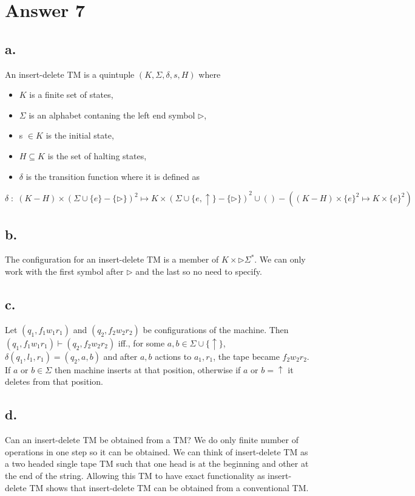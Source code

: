 \documentclass[12pt]{article}
\begin{document}
\section*{Answer 7}

  \subsection*{a.}
    An insert-delete TM is a quintuple $(K, \Sigma, \delta, s, H)$ where
    \begin{itemize}
      \item $K$ is a finite set of states,
      \item $\Sigma$ is an alphabet contaning the left end symbol $\triangleright$,
      \item s $\in K$ is the initial state,
      \item $H\subseteq K$ is the set of halting states,
      \item $\delta$ is the transition function where it is defined as 
    \end{itemize}
    $\delta\;:\;(K-H) \times (\Sigma\cup\{e\}-\{\triangleright\})^2 \mapsto K\times(\Sigma\cup\{e,\uparrow\}-\{\triangleright\})^2 \cup () - ((K-H) \times \{e\}^2 \mapsto K\times\{e\}^2)$

  \subsection*{b.} 
    \qquad The configuration for an insert-delete TM is a member of $K \times \triangleright\Sigma^*$. We can only work with the first symbol after $\triangleright$ and the last so no need to specify.

  \subsection*{c.}
    \qquad Let $(q_1, f_1w_1r_1)$ and $(q_2, f_2w_2r_2)$ be configurations of the machine. Then $(q_1, f_1w_1r_1) \vdash (q_2, f_2w_2r_2)$ iff., for some $a,b \in \Sigma\cup\{\uparrow\}$, $\delta(q_1, l_1, r_1) = (q_2, a, b)$ and after $a, b$ actions to $a_1, r_1$, the tape became $f_2w_2r_2$. If $a\text{ or }b\in\Sigma$ then machine inserts at that position, otherwise if $a \text{ or } b = \uparrow$ it deletes from that position.

  \subsection*{d.}
    \qquad Can an insert-delete TM be obtained from a TM? We do only finite number of operations in one step so it can be obtained. We can think of insert-delete TM as a two headed single tape TM such that one head is at the beginning and other at the end of the string. Allowing this TM to have exact functionality as insert-delete TM shows that insert-delete TM can be obtained from a conventional TM.
\end{document}
